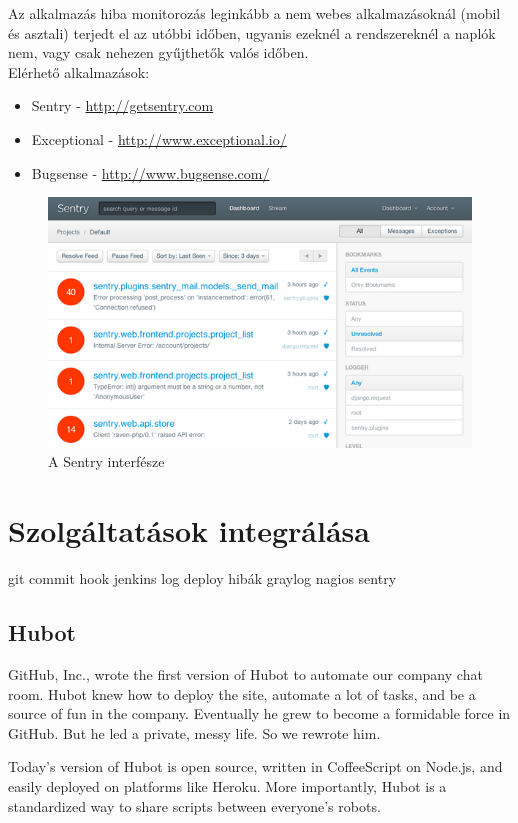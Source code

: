 Az alkalmazás hiba monitorozás leginkább a nem webes alkalmazásoknál (mobil és asztali) terjedt el az utóbbi időben, ugyanis ezeknél a rendszereknél a naplók nem, vagy csak nehezen gyűjthetők valós időben.\\

Elérhető alkalmazások:
\begin{itemize}
\item Sentry - \url{http://getsentry.com}
\item Exceptional - \url{http://www.exceptional.io/}
\item Bugsense - \url{http://www.bugsense.com/}
\end{itemize}

\begin{figure}[ht]
	\centering
		\includegraphics[scale=1]{assets/sentry.png}%
		\caption[DUMMY]%
		{A Sentry interfésze}%
		\label{fig:sentry}
\end{figure}

\section{Szolgáltatások integrálása\\}
git commit hook
jenkins log
deploy
hibák
graylog
nagios
sentry
\subsection{Hubot}

GitHub, Inc., wrote the first version of Hubot to automate our company chat room. Hubot knew how to deploy the site, automate a lot of tasks, and be a source of fun in the company. Eventually he grew to become a formidable force in GitHub. But he led a private, messy life. So we rewrote him.

Today's version of Hubot is open source, written in CoffeeScript on Node.js, and easily deployed on platforms like Heroku. More importantly, Hubot is a standardized way to share scripts between everyone's robots.